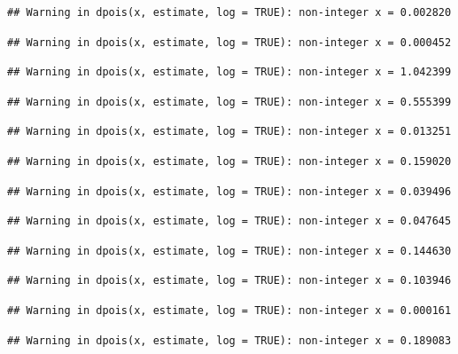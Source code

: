 \documentclass[]{article}
\begin{document}
\begin{verbatim}
## Warning in dpois(x, estimate, log = TRUE): non-integer x = 0.002820
\end{verbatim}

\begin{verbatim}
## Warning in dpois(x, estimate, log = TRUE): non-integer x = 0.000452
\end{verbatim}

\begin{verbatim}
## Warning in dpois(x, estimate, log = TRUE): non-integer x = 1.042399
\end{verbatim}

\begin{verbatim}
## Warning in dpois(x, estimate, log = TRUE): non-integer x = 0.555399
\end{verbatim}

\begin{verbatim}
## Warning in dpois(x, estimate, log = TRUE): non-integer x = 0.013251
\end{verbatim}

\begin{verbatim}
## Warning in dpois(x, estimate, log = TRUE): non-integer x = 0.159020
\end{verbatim}

\begin{verbatim}
## Warning in dpois(x, estimate, log = TRUE): non-integer x = 0.039496
\end{verbatim}

\begin{verbatim}
## Warning in dpois(x, estimate, log = TRUE): non-integer x = 0.047645
\end{verbatim}

\begin{verbatim}
## Warning in dpois(x, estimate, log = TRUE): non-integer x = 0.144630
\end{verbatim}

\begin{verbatim}
## Warning in dpois(x, estimate, log = TRUE): non-integer x = 0.103946
\end{verbatim}

\begin{verbatim}
## Warning in dpois(x, estimate, log = TRUE): non-integer x = 0.000161
\end{verbatim}

\begin{verbatim}
## Warning in dpois(x, estimate, log = TRUE): non-integer x = 0.189083
\end{verbatim}
\end{document}
